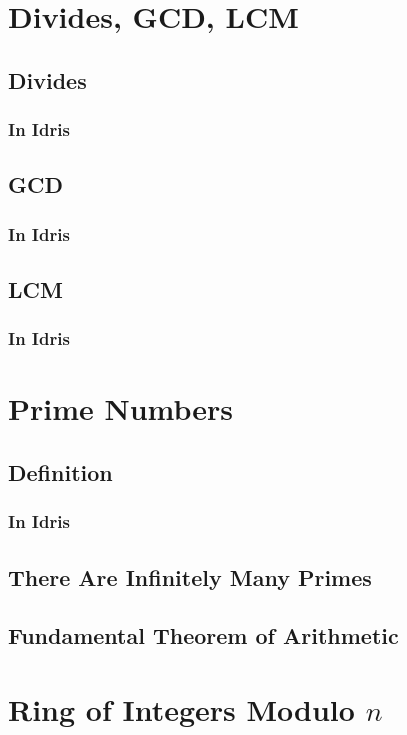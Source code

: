 \documentclass{article}
\begin{document}
\section{Divides, GCD, LCM}
\subsection{Divides}
\subsubsection{In Idris}

\subsection{GCD}
\subsubsection{In Idris}

\subsection{LCM}
\subsubsection{In Idris}

\section{Prime Numbers}
\subsection{Definition}
\subsubsection{In Idris}

\subsection{There Are Infinitely Many Primes}

\subsection{Fundamental Theorem of Arithmetic}

\section{Ring of Integers Modulo $n$}
\end{document}
